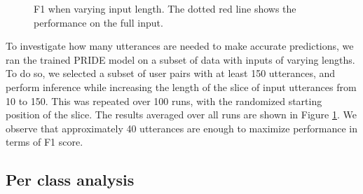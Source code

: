 \begin{figure}[t!]
\centering
{}
\caption{F1 when varying input length. The dotted red line shows the performance on the full input.}
\label{increasing}
\end{figure}

To investigate how many utterances are needed to make accurate predictions, we ran the trained PRIDE model on a subset of data with inputs of varying lengths.
To do so, we selected a subset of user pairs with at least 150 utterances, and perform inference while increasing the length of the slice of input utterances from 10 to 150.
This was repeated over 100 runs, with the randomized starting position of the slice.
The results averaged over all runs are shown in Figure \ref{increasing}.
We observe that approximately 40 utterances are enough to maximize performance in terms of F1 score.

\subsection{Per class analysis}


